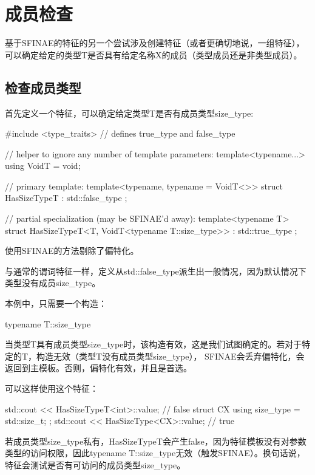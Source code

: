 \section{成员检查}

基于SFINAE的特征的另一个尝试涉及创建特征（或者更确切地说，一组特征），可以确定给定的类型T是否具有给定名称X的成员（类型成员还是非类型成员）。

\subsection{检查成员类型}

首先定义一个特征，可以确定给定类型T是否有成员类型size\_type:

\begin{cpp}
#include <type_traits> // defines true_type and false_type

// helper to ignore any number of template parameters:
template<typename...> using VoidT = void;

// primary template:
template<typename, typename = VoidT<>>
struct HasSizeTypeT : std::false_type
{
};

// partial specialization (may be SFINAE'd away):
template<typename T>
struct HasSizeTypeT<T, VoidT<typename T::size_type>> : std::true_type
{
};
\end{cpp}

使用SFINAE的方法剔除了偏特化。

与通常的谓词特征一样，定义从std::false\_type派生出一般情况，因为默认情况下类型没有成员size\_type。

本例中，只需要一个构造：

\begin{cpp}
typename T::size_type
\end{cpp}

当类型T具有成员类型size\_type时，该构造有效，这是我们试图确定的。若对于特定的T，构造无效（类型T没有成员类型size\_type）， SFINAE会丢弃偏特化，会返回到主模板。否则，偏特化有效，并且是首选。

可以这样使用这个特征：

\begin{cpp}
std::cout << HasSizeTypeT<int>::value; // false
struct CX {
	using size_type = std::size_t;
};
std::cout << HasSizeType<CX>::value; // true
\end{cpp}

若成员类型size\_type私有，HasSizeTypeT会产生false，因为特征模板没有对参数类型的访问权限，因此typename T::size\_type无效（触发SFINAE）。换句话说，特征会测试是否有可访问的成员类型size\_type。

